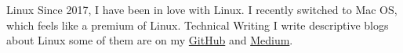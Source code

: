 



\begin{cvskills}
  \cvskill
    {Linux} %
    {Since 2017, I have been in love with Linux. I recently switched to Mac OS, which feels like a premium of Linux.} %
  \cvskill
    {Technical Writing} %
    {I write descriptive blogs about Linux some of them are on my \href{https://github.com/themagicalmammal/howtodebuntu}{GitHub} and \href{https://medium.com/@d19cyber}{Medium}.} %

\end{cvskills}